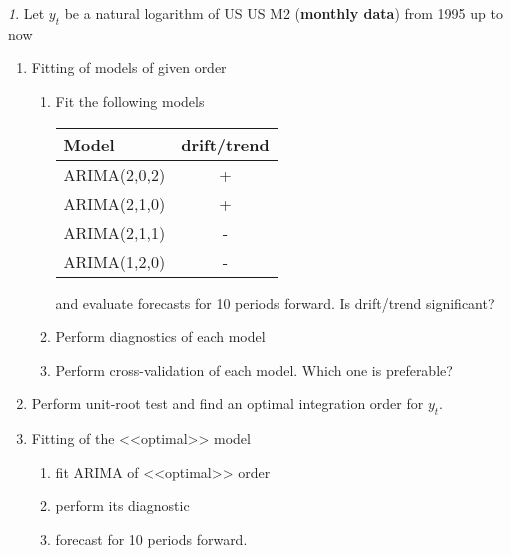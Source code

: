\documentclass[12pt]{article}
\theoremstyle{remark}
\newtheorem{exercise}{}[section]
\begin{document}
\begin{exercise}
Let \(y_t\) be a natural logarithm of  US US M2 (\textbf{monthly data}) from 1995 up to now
	\begin{enumerate}
		\item Fitting of models of given order
		\begin{enumerate}
			\item Fit the following models
			\begin{center}\small
				\begin{tabular}{l|c}
					Model & drift/trend \\ \hline
					ARIMA(2,0,2) & + \\
					ARIMA(2,1,0) & + \\
					ARIMA(2,1,1) & - \\
					ARIMA(1,2,0) & - \\ \hline
				\end{tabular}
			\end{center} 
			and evaluate forecasts for 10 periods forward. Is drift/trend significant?
			\item Perform diagnostics of each model
			\item Perform cross-validation of each model. Which one is preferable?
		\end{enumerate}
		\item Perform unit-root test and find an optimal integration order for  \(y_t\). 
		\item Fitting of the <<optimal>> model
		\begin{enumerate}
			\item fit ARIMA of <<optimal>> order
			\item perform its diagnostic
			\item forecast for 10 periods forward.
		\end{enumerate}
	\end{enumerate}
\end{exercise}
\end{document}
